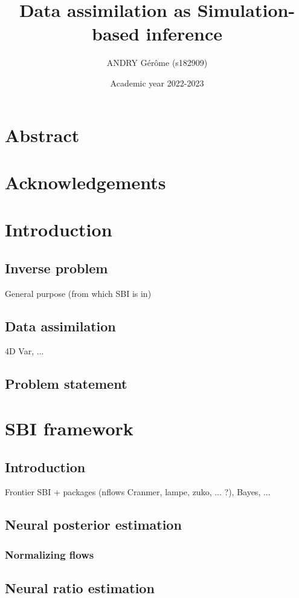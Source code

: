 \documentclass[a4paper, 12pt]{article}
\title{Data assimilation as Simulation-based inference}
\author{ANDRY Gérôme (s182909)}
\date{Academic year 2022-2023}
\begin{document}
\maketitle

\newpage
\section*{Abstract}


\newpage
\section*{Acknowledgements}

\newpage
\tableofcontents
\newpage


\section{Introduction}
\subsection{Inverse problem}
General purpose (from which SBI is in)
\subsection{Data assimilation}
4D Var, ... 
\subsection{Problem statement}

\section{SBI framework}
\subsection{Introduction}
Frontier SBI + packages (nflows Cranmer, lampe, zuko, ... ?), Bayes, ...
\subsection{Neural posterior estimation}
\subsubsection{Normalizing flows}
\subsection{Neural ratio estimation}
\end{document}
